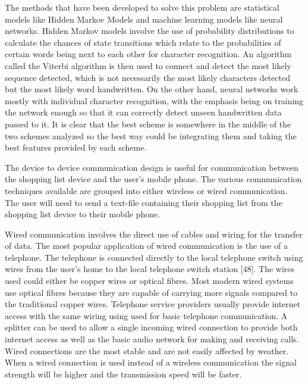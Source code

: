 The methods that have been developed to solve this problem are statistical models like Hidden Markov Models and machine learning models like neural networks. Hidden Markov models involve the use of probability distributions to calculate the chances of state transitions which relate to the probabilities of certain words being next to each other for character recognition. An algorithm called the Viterbi algorithm is then used to connect and detect the most likely sequence detected, which is not necessarily the most likely characters detected but the most likely word handwritten. On the other hand, neural networks work mostly with individual character recognition, with the emphasis being on training the network enough so that it can correctly detect unseen handwritten data passed to it. It is clear that the best scheme is somewhere in the middle of the two schemes analyzed so the best way could be integrating them and taking the best features provided by each scheme. 

The device to device communication design is useful for communication between the shopping list device and the user’s mobile phone. The various communication techniques available are grouped into either wireless or wired communication. The user will need to send a text-file containing their shopping list from the shopping list device to their mobile phone.  

Wired communication involves the direct use of cables and wiring for the transfer of data. The most popular application of wired communication is the use of a telephone. The telephone is connected directly to the local telephone switch using wires from the user’s home to the local telephone switch station [48]. The wires used could either be copper wires or optical fibres. Most modern wired systems use optical fibres because they are capable of carrying more signals compared to the traditional copper wires. Telephone service providers usually provide internet access with the same wiring using used for basic telephone communication. A splitter can be used to allow a single incoming wired connection to provide both internet access as well as the basic audio network for making and receiving calls. Wired connections are the most stable and are not easily affected by weather. When a wired connection is used instead of a wireless communication the signal strength will be higher and the transmission speed will be faster. 

